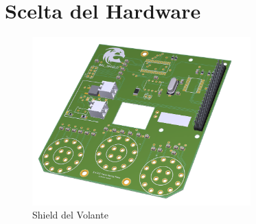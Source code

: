 \section{Scelta del Hardware}

\begin{figure}[hbt!]
    \centering
    \includegraphics[width=0.75\textwidth]{./figures/imageshield.png}
    \caption{Shield del Volante}
\end{figure}


